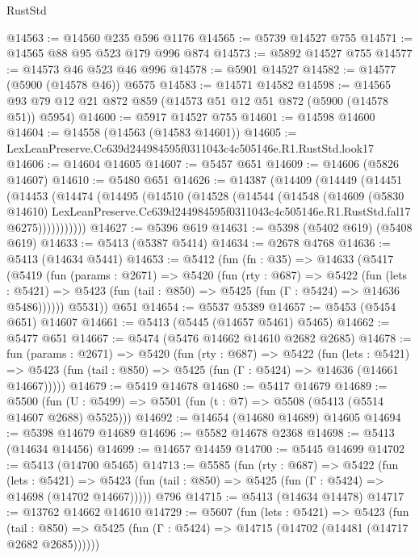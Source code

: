 \begin{lexlean}{RustStd}
\begin{coremodule}
@14563 := @14560 @235 @596 @1176
@14565 := @5739 @14527 @755
@14571 := @14565 @88 @95 @523 @179 @996 @874
@14573 := @5892 @14527 @755
@14577 := @14573 @46 @523 @46 @996
@14578 := @5901 @14527
@14582 := @14577 (@5900 (@14578 @46)) @6575
@14583 := @14571 @14582
@14598 := @14565 @93 @79 @12 @21 @872 @859 (@14573 @51 @12 @51 @872 (@5900 (@14578 @51)) @5954)
@14600 := @5917 @14527 @755
@14601 := @14598 @14600
@14604 := @14558 (@14563 (@14583 @14601))
@14605 := LexLeanPreserve.Cc639d244984595f0311043c4c505146e.R1.RustStd.look17
@14606 := @14604 @14605
@14607 := @5457 @651
@14609 := @14606 (@5826 @14607)
@14610 := @5480 @651
@14626 := @14387
    (@14409
      (@14449
        (@14451
          (@14453
            (@14474
              (@14495
                (@14510
                  (@14528
                    (@14544
                      (@14548
                        (@14609
                          (@5830 @14610)
                          LexLeanPreserve.Cc639d244984595f0311043c4c505146e.R1.RustStd.fal17
                          @6275)))))))))))
@14627 := @5396 @619
@14631 := @5398 (@5402 @619) (@5408 @619)
@14633 := @5413 (@5387 @5414)
@14634 := @2678 @4768
@14636 := @5413 (@14634 @5441)
@14653 := @5412
    (fun (fn : @35) =>
    @14633
      (@5417
        (@5419
          (fun (params : @2671) =>
          @5420
            (fun (rty : @687) =>
            @5422
              (fun (lets : @5421) =>
              @5423 (fun (tail : @850) => @5425 (fun (Γ : @5424) => @14636 @5486))))))
        @5531))
    @651
@14654 := @5537 @5389
@14657 := @5453 (@5454 @651) @14607
@14661 := @5413 (@5445 (@14657 @5461) @5465)
@14662 := @5477 @651
@14667 := @5474 (@5476 @14662 @14610 @2682 @2685)
@14678 := fun (params : @2671) =>
  @5420
    (fun (rty : @687) =>
    @5422
      (fun (lets : @5421) =>
      @5423 (fun (tail : @850) => @5425 (fun (Γ : @5424) => @14636 (@14661 @14667)))))
@14679 := @5419 @14678
@14680 := @5417 @14679
@14689 := @5500
    (fun (U : @5499) => @5501 (fun (t : @7) => @5508 (@5413 (@5514 @14607 @2688) @5525)))
@14692 := @14654 (@14680 @14689) @14605
@14694 := @5398 @14679 @14689
@14696 := @5582 @14678 @2368
@14698 := @5413 (@14634 @14456)
@14699 := @14657 @14459
@14700 := @5445 @14699
@14702 := @5413 (@14700 @5465)
@14713 := @5585
    (fun (rty : @687) =>
    @5422
      (fun (lets : @5421) =>
      @5423 (fun (tail : @850) => @5425 (fun (Γ : @5424) => @14698 (@14702 @14667)))))
    @796
@14715 := @5413 (@14634 @14478)
@14717 := @13762 @14662 @14610
@14729 := @5607
    (fun (lets : @5421) =>
    @5423
      (fun (tail : @850) =>
      @5425 (fun (Γ : @5424) => @14715 (@14702 (@14481 (@14717 @2682 @2685))))))

\end{coremodule}
\end{lexlean}
